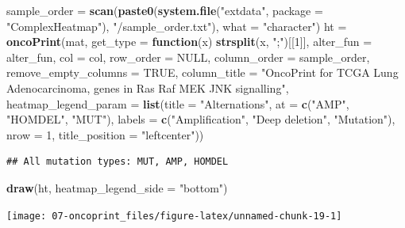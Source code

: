 \documentclass[]{book}
\newenvironment{Shaded}{\begin{snugshade}}{\end{snugshade}}
\newcommand{\KeywordTok}[1]{\textcolor[rgb]{0.13,0.29,0.53}{\textbf{#1}}}
\newcommand{\DataTypeTok}[1]{\textcolor[rgb]{0.13,0.29,0.53}{#1}}
\newcommand{\DecValTok}[1]{\textcolor[rgb]{0.00,0.00,0.81}{#1}}
\newcommand{\StringTok}[1]{\textcolor[rgb]{0.31,0.60,0.02}{#1}}
\newcommand{\OtherTok}[1]{\textcolor[rgb]{0.56,0.35,0.01}{#1}}
\newcommand{\ControlFlowTok}[1]{\textcolor[rgb]{0.13,0.29,0.53}{\textbf{#1}}}
\newcommand{\NormalTok}[1]{#1}
\theoremstyle{definition}
\theoremstyle{definition}
\theoremstyle{definition}
\theoremstyle{remark}
\begin{document}
\begin{Shaded}
\begin{Highlighting}[]
\NormalTok{sample_order =}\StringTok{ }\KeywordTok{scan}\NormalTok{(}\KeywordTok{paste0}\NormalTok{(}\KeywordTok{system.file}\NormalTok{(}\StringTok{"extdata"}\NormalTok{, }\DataTypeTok{package =} \StringTok{"ComplexHeatmap"}\NormalTok{), }
    \StringTok{"/sample_order.txt"}\NormalTok{), }\DataTypeTok{what =} \StringTok{"character"}\NormalTok{)}
\NormalTok{ht =}\StringTok{ }\KeywordTok{oncoPrint}\NormalTok{(mat, }\DataTypeTok{get_type =} \ControlFlowTok{function}\NormalTok{(x) }\KeywordTok{strsplit}\NormalTok{(x, }\StringTok{";"}\NormalTok{)[[}\DecValTok{1}\NormalTok{]],}
    \DataTypeTok{alter_fun =}\NormalTok{ alter_fun, }\DataTypeTok{col =}\NormalTok{ col, }
    \DataTypeTok{row_order =} \OtherTok{NULL}\NormalTok{, }\DataTypeTok{column_order =}\NormalTok{ sample_order,}
    \DataTypeTok{remove_empty_columns =} \OtherTok{TRUE}\NormalTok{,}
    \DataTypeTok{column_title =} \StringTok{"OncoPrint for TCGA Lung Adenocarcinoma, genes in Ras Raf MEK JNK signalling"}\NormalTok{,}
    \DataTypeTok{heatmap_legend_param =} \KeywordTok{list}\NormalTok{(}\DataTypeTok{title =} \StringTok{"Alternations"}\NormalTok{, }\DataTypeTok{at =} \KeywordTok{c}\NormalTok{(}\StringTok{"AMP"}\NormalTok{, }\StringTok{"HOMDEL"}\NormalTok{, }\StringTok{"MUT"}\NormalTok{), }
        \DataTypeTok{labels =} \KeywordTok{c}\NormalTok{(}\StringTok{"Amplification"}\NormalTok{, }\StringTok{"Deep deletion"}\NormalTok{, }\StringTok{"Mutation"}\NormalTok{),}
        \DataTypeTok{nrow =} \DecValTok{1}\NormalTok{, }\DataTypeTok{title_position =} \StringTok{"leftcenter"}\NormalTok{))}
\end{Highlighting}
\end{Shaded}

\begin{verbatim}
## All mutation types: MUT, AMP, HOMDEL
\end{verbatim}

\begin{Shaded}
\begin{Highlighting}[]
\KeywordTok{draw}\NormalTok{(ht, }\DataTypeTok{heatmap_legend_side =} \StringTok{"bottom"}\NormalTok{)}
\end{Highlighting}
\end{Shaded}

\begin{center}\texttt{[image: 07-oncoprint\_files/figure-latex/unnamed-chunk-19-1]} \end{center}
\end{document}
